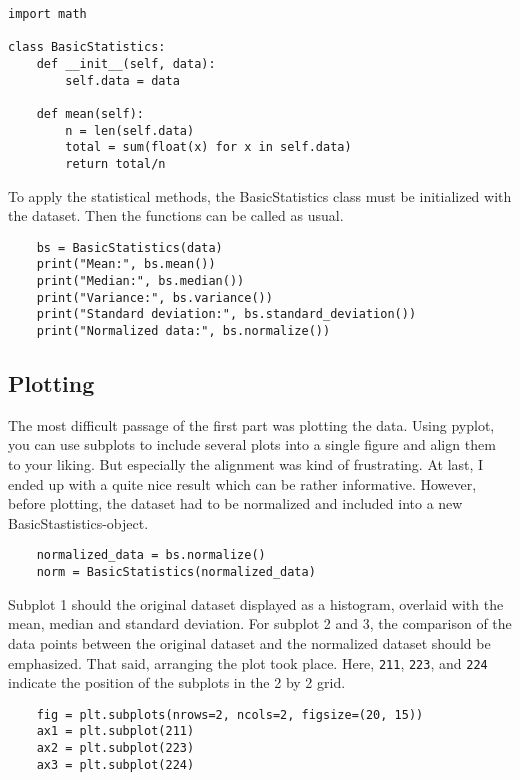 \documentclass{CPSReport}
\begin{document}
\begin{verbatim}
import math

class BasicStatistics:
    def __init__(self, data):
        self.data = data
    
    def mean(self):
        n = len(self.data)
        total = sum(float(x) for x in self.data)
        return total/n
\end{verbatim}

To apply the statistical methods, the BasicStatistics class must be initialized with the dataset. Then the functions can be called as usual.
\begin{verbatim}
    bs = BasicStatistics(data)
    print("Mean:", bs.mean())
    print("Median:", bs.median())
    print("Variance:", bs.variance())
    print("Standard deviation:", bs.standard_deviation())
    print("Normalized data:", bs.normalize())
\end{verbatim}

\subsection{Plotting}
The most difficult passage of the first part was plotting the data. Using pyplot, you can use subplots to include several plots into a single figure and align them to your liking. But especially the alignment was kind of frustrating. At last, I ended up with a quite nice result which can be rather informative.
However, before plotting, the dataset had to be normalized and included into a new BasicStastistics-object.

\begin{verbatim}
    normalized_data = bs.normalize()
    norm = BasicStatistics(normalized_data)
\end{verbatim}

Subplot 1 should the original dataset displayed as a histogram, overlaid with the mean, median and standard deviation. For subplot 2 and 3, the comparison of the data points between the original dataset and the normalized dataset should be emphasized.
That said, arranging the plot took place. Here, \texttt{211}, \texttt{223}, and \texttt{224} indicate the position of the subplots in the 2 by 2 grid.

\begin{verbatim}
    fig = plt.subplots(nrows=2, ncols=2, figsize=(20, 15))
    ax1 = plt.subplot(211)
    ax2 = plt.subplot(223)
    ax3 = plt.subplot(224)
\end{verbatim}
\end{document}
